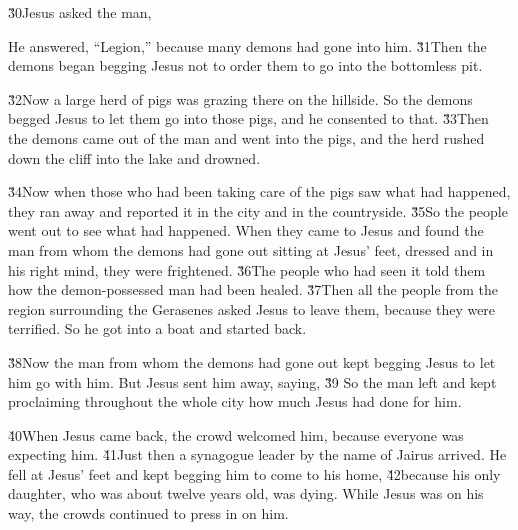 \v{30}Jesus asked the man, 

He answered, ``Legion,'' because many demons had gone into him. \v{31}Then the demons began begging Jesus not to order them to go into the bottomless pit.

\v{32}Now a large herd of pigs was grazing there on the hillside. So the demons begged Jesus to let them go into those pigs, and he consented to that. \v{33}Then the demons came out of the man and went into the pigs, and the herd rushed down the cliff into the lake and drowned.

\v{34}Now when those who had been taking care of the pigs saw what had happened, they ran away and reported it in the city and in the countryside. \v{35}So the people went out to see what had happened. When they came to Jesus and found the man from whom the demons had gone out sitting at Jesus' feet, dressed and in his right mind, they were frightened. \v{36}The people who had seen it told them how the demon-possessed man had been healed. \v{37}Then all the people from the region surrounding the Gerasenes asked Jesus to leave them, because they were terrified. So he got into a boat and started back.

\v{38}Now the man from whom the demons had gone out kept begging Jesus to let him go with him. But Jesus sent him away, saying, \v{39} So the man left and kept proclaiming throughout the whole city how much Jesus had done for him.

\v{40}When Jesus came back, the crowd welcomed him, because everyone was expecting him. \v{41}Just then a synagogue leader by the name of Jairus arrived. He fell at Jesus' feet and kept begging him to come to his home, \v{42}because his only daughter, who was about twelve years old, was dying. While Jesus was on his way, the crowds continued to press in on him.

